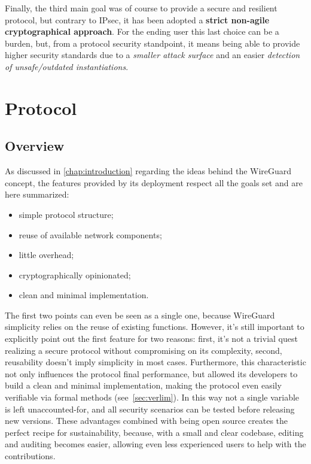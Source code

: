 \documentclass[light]{academica}
\begin{document}
Finally, the third main goal was of course to provide a secure and resilient protocol, but contrary to IPsec, it has been adopted a \textbf{strict non-agile cryptographical approach}.
For the ending user this last choice can be a burden, but, from a protocol security standpoint, it means being able to provide higher security standards due to a \textsl{smaller attack surface} and an easier \textsl{detection of unsafe/outdated instantiations}.


\chapter{Protocol}\label{chap:protocol}

\section{Overview}\label{sec:overview}

As discussed in \autoref{chap:introduction} regarding the ideas behind the WireGuard concept, the features provided by its deployment respect all the goals set and are here summarized:
\begin{itemize}
  \item simple protocol structure;
  \item reuse of available network components;
  \item little overhead;
  \item cryptographically opinionated;
  \item clean and minimal implementation.
\end{itemize}

The first two points can even be seen as a single one, because WireGuard simplicity relies on the reuse of existing functions.
However, it's still important to explicitly point out the first feature for two reasons: first, it's not a trivial quest realizing a secure protocol without compromising on its complexity, second, reusability doesn't imply simplicity in most cases.
Furthermore, this characteristic not only influences the protocol final performance, but allowed its developers to build a clean and minimal implementation, making the protocol even easily verifiable via formal methods (see~\autoref{sec:verlim}).
In this way not a single variable is left unaccounted-for, and all security scenarios can be tested before releasing new versions.
These advantages combined with being open source creates the perfect recipe for sustainability, because, with a small and clear codebase, editing and auditing becomes easier, allowing even less experienced users to help with the contributions.
\end{document}
